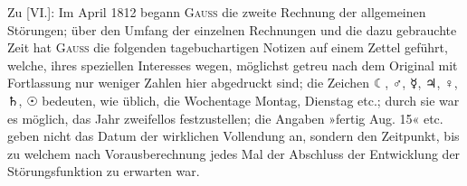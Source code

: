 \clearpage
\begingroup
{}
\renewcommand{\headrulewidth}{0pt}
\begingroup
\newcommand{\BJournalDay}[1]{{\upshape\AstroSymbols #1}}
\par\noindent\hspace*{\parindent}Zu [VI.]: Im April 1812 begann \textsc{Gauss} die zweite Rechnung der
allgemeinen Störungen; über den Umfang der einzelnen Rechnungen und die dazu
gebrauchte Zeit hat \textsc{Gauss} die folgenden tagebuchartigen Notizen auf einem
Zettel geführt, welche, ihres speziellen Interesses wegen, möglichst getreu nach
dem Original mit Fortlassung nur weniger Zahlen hier abgedruckt sind; die Zeichen
\BJournalDay{☾}, \BJournalDay{♂}, \BJournalDay{☿}, \BJournalDay{♃},
\BJournalDay{♀}, \BJournalDay{♄}, \BJournalDay{☉} bedeuten, wie üblich, die
Wochentage Montag, Dienstag etc.; durch sie war es möglich, das Jahr zweifellos
festzustellen; die Angaben »fertig Aug. 15« etc. geben nicht das Datum der
wirklichen Vollendung an, sondern den Zeitpunkt, bis zu welchem nach
Vorausberechnung jedes Mal der Abschluss der Entwicklung der Störungsfunktion
zu erwarten war.

